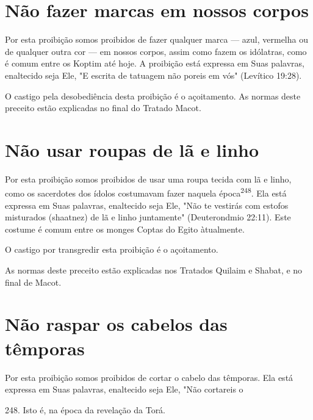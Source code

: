 \section{Não fazer marcas em nossos corpos}

Por esta proibição somos proibidos de fazer qualquer marca --- azul,
vermelha ou de qualquer outra cor --- em nossos corpos, assim como fazem
os idólatras, como é comum entre os Koptim até hoje. A proibição está
expres­sa em Suas palavras, enaltecido seja Ele, "E escrita de tatuagem
não poreis em vós" (Levítico 19:28).

O castigo pela desobediência desta proibição é o açoitamento. As normas
deste preceito estão explicadas no final do Tratado Macot.


\section{Não usar roupas de lã e linho}


Por esta proibição somos proibidos de usar uma roupa tecida com lã e
linho, como os sacerdotes dos ídolos costumavam fazer naquela
época\textsuperscript{248}. Ela está expressa em Suas palavras,
enaltecido seja Ele, "Não te vestirás com estofos misturados (shaatnez)
de lã e linho juntamente" (Deuterondmio 22:11). Este costume é comum
entre os monges Coptas do Egito àtualmente.

O castigo por transgredir esta proibição é o açoitamento.

As normas deste preceito estão explicadas nos Tratados Quilaim e Shabat,
e no final de Macot.

\section{Não raspar os cabelos das têmporas}

Por esta proibição somos proibidos de cortar o cabelo das têmpo­ras. Ela
está expressa em Suas palavras, enaltecido seja Ele, "Não cortareis o

248. Isto é, na época da revelação da Torá.

